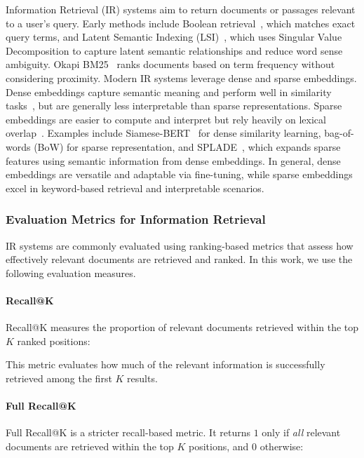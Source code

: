\documentclass[11pt]{article}
\begin{document}
Information Retrieval (IR) systems aim to return documents or passages relevant to a user’s query. Early methods include Boolean retrieval~\cite{DBLP:books/daglib/0021593}, which matches exact query terms, and Latent Semantic Indexing (LSI)~\cite{DBLP:journals/jasis/DeerwesterDLFH90}, which uses Singular Value Decomposition to capture latent semantic relationships and reduce word sense ambiguity. Okapi BM25~\cite{DBLP:journals/ftir/RobertsonZ09} ranks documents based on term frequency without considering proximity.
Modern IR systems leverage dense and sparse embeddings. Dense embeddings capture semantic meaning and perform well in similarity tasks~\cite{kang-etal-2025-interpret}, but are generally less interpretable than sparse representations. Sparse embeddings are easier to compute and interpret but rely heavily on lexical overlap~\cite{guillot-etal-2023-sparser}. Examples include Siamese-BERT~\cite{DBLP:conf/emnlp/ReimersG19,DBLP:journals/ai/WangWLLZ23} for dense similarity learning, bag-of-words (BoW) for sparse representation, and SPLADE~\cite{DBLP:conf/sigir/FormalPC21}, which expands sparse features using semantic information from dense embeddings.
In general, dense embeddings are versatile and adaptable via fine-tuning, while sparse embeddings excel in keyword-based retrieval and interpretable scenarios.

\subsubsection{Evaluation Metrics for Information Retrieval}

IR systems are commonly evaluated using ranking-based metrics that assess how effectively relevant documents are retrieved and ranked. In this work, we use the following evaluation measures.

\paragraph{Recall@K}
Recall@K measures the proportion of relevant documents retrieved within the top $K$ ranked positions:

This metric evaluates how much of the relevant information is successfully retrieved among the first $K$ results.

\paragraph{Full Recall@K}
Full Recall@K is a stricter recall-based metric. It returns $1$ only if \emph{all} relevant documents are retrieved within the top $K$ positions, and $0$ otherwise:
\end{document}
